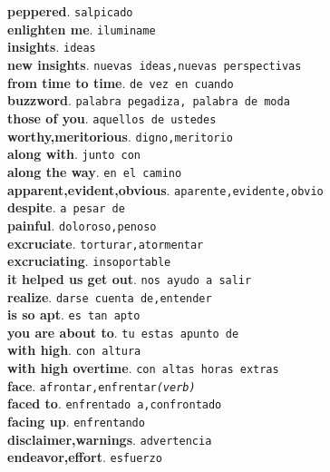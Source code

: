 \documentclass[twocolumn]{article}
\begin{document}
	\textsf{\textbf{peppered}}. \texttt{salpicado}\\
	\textsf{\textbf{enlighten me}}. \texttt{iluminame}\\
	\textsf{\textbf{insights}}. \texttt{ideas}\\
	\textsf{\textbf{new insights}}. \texttt{nuevas ideas,nuevas perspectivas}\\
	\textsf{\textbf{from time to time}}. \texttt{de vez en cuando}\\
	\textsf{\textbf{buzzword}}. \texttt{palabra pegadiza, palabra de moda}\\
	\textsf{\textbf{those of you}}. \texttt{aquellos de ustedes}\\
	\textsf{\textbf{worthy,meritorious}}. \texttt{digno,meritorio}\\
	\textsf{\textbf{along with}}. \texttt{junto con}\\
	\textsf{\textbf{along the way}}. \texttt{en el camino}\\
	\textsf{\textbf{apparent,evident,obvious}}. \texttt{aparente,evidente,obvio}\\
	\textsf{\textbf{despite}}. \texttt{a pesar de}\\
	\textsf{\textbf{painful}}. \texttt{doloroso,penoso}\\
	\textsf{\textbf{excruciate}}. \texttt{torturar,atormentar}\\
	\textsf{\textbf{excruciating}}. \texttt{insoportable}\\
	\textsf{\textbf{it helped us get out}}. \texttt{nos ayudo a salir}\\
	\textsf{\textbf{realize}}. \texttt{darse cuenta de,entender}\\
	\textsf{\textbf{is so apt}}. \texttt{es tan apto}\\
	\textsf{\textbf{you are about to}}. \texttt{tu estas apunto de}\\
	\textsf{\textbf{with high}}. \texttt{con altura}\\
	\textsf{\textbf{with high overtime}}. \texttt{con altas horas extras}\\
	\textsf{\textbf{face}}. \texttt{afrontar,enfrentar{\scriptsize \textsl{(verb)}}}\\
	\textsf{\textbf{faced to}}. \texttt{enfrentado a,confrontado}\\
	\textsf{\textbf{facing up}}. \texttt{enfrentando}\\
	\textsf{\textbf{disclaimer,warnings}}. \texttt{advertencia}\\
	\textsf{\textbf{endeavor,effort}}. \texttt{esfuerzo}\\
\end{document}
